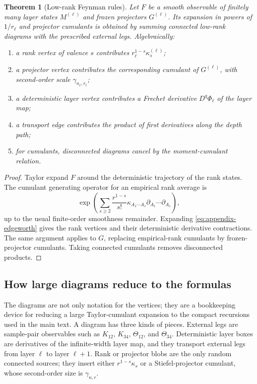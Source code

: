 \documentclass{article}
\newtheorem{theorem}{Theorem}[section]
\begin{document}
\begin{theorem}[Low-rank Feynman rules]
\label{thm:lowrank-feynman-rules}
Let \(F\) be a smooth observable of finitely many layer states \(M^{(\ell)}\) and frozen projectors \(G^{(\ell)}\). Its expansion in powers of \(1/r_\ell\) and projector cumulants is obtained by summing connected low-rank diagrams with the prescribed external legs. Algebraically:
\begin{enumerate}[leftmargin=1.5em]
\item a rank vertex of valence \(s\) contributes \(r_\ell^{1-s}\kappa_s^{(\ell)}\);
\item a projector vertex contributes the corresponding cumulant of \(G^{(\ell)}\), with second-order scale \(\gamma_{n_\ell,r_\ell}\);
\item a deterministic layer vertex contributes a Frechet derivative \(D^q\Phi_\ell\) of the layer map;
\item a transport edge contributes the product of first derivatives along the depth path;
\item for cumulants, disconnected diagrams cancel by the moment-cumulant relation.
\end{enumerate}
\end{theorem}

\begin{proof}
Taylor expand \(F\) around the deterministic trajectory of the rank states. The cumulant generating operator for an empirical rank average is
\begin{equation}
\exp\left(
\sum_{s\ge2}\frac{r^{1-s}}{s!}
\kappa_{A_1\cdots A_s}
\partial_{A_1}\cdots\partial_{A_s}
\right),
\label{eq:appendix-edgeworth}
\end{equation}
up to the usual finite-order smoothness remainder. Expanding \eqref{eq:appendix-edgeworth} gives the rank vertices and their deterministic derivative contractions. The same argument applies to \(G\), replacing empirical-rank cumulants by frozen-projector cumulants. Taking connected cumulants removes disconnected products.
\end{proof}

\subsection{How large diagrams reduce to the formulas}
\label{app:diagram-reduction}
The diagrams are not only notation for the vertices; they are a bookkeeping device for reducing a large Taylor-cumulant expansion to the compact recursions used in the main text. A diagram has three kinds of pieces. External legs are sample-pair observables such as \(K_{12}\), \(K_{34}\), \(\Theta_{12}\), and \(\Theta_{34}\). Deterministic layer boxes are derivatives of the infinite-width layer map, and they transport external legs from layer \(\ell\) to layer \(\ell+1\). Rank or projector blobs are the only random connected sources; they insert either \(r^{1-s}\kappa_s\) or a Stiefel-projector cumulant, whose second-order size is \(\gamma_{n,r}\).
\end{document}
